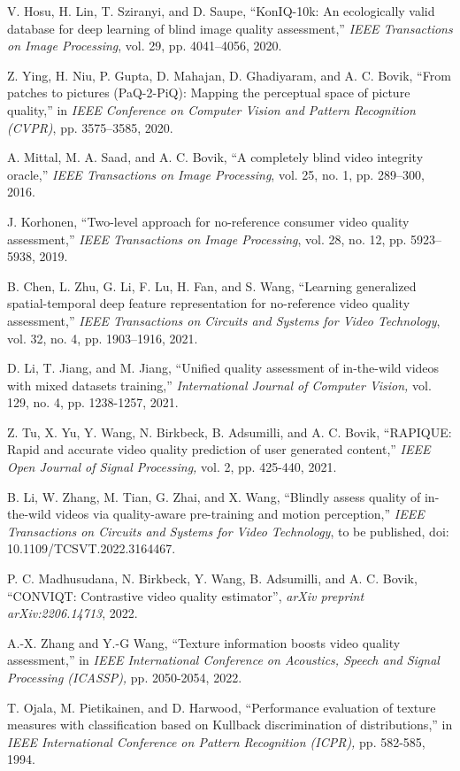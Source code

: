 \documentclass[journal]{IEEEtran}
\begin{document}
\begin{thebibliography}{5}
V. Hosu, H. Lin, T. Sziranyi, and D. Saupe, ``KonIQ-10k: An ecologically valid database for deep learning of blind image quality assessment,'' \emph{IEEE Transactions on Image Processing}, vol. 29, pp. 4041–4056, 2020.

Z. Ying, H. Niu, P. Gupta, D. Mahajan, D. Ghadiyaram, and A. C. Bovik, ``From patches to pictures (PaQ-2-PiQ): Mapping the perceptual space of picture quality,'' in \emph{IEEE Conference on Computer Vision and Pattern Recognition (CVPR)}, pp. 3575–3585, 2020.

A. Mittal, M. A. Saad, and A. C. Bovik, ``A completely blind video integrity oracle,'' \emph{IEEE Transactions on Image Processing}, vol. 25, no. 1, pp. 289–300, 2016.



J. Korhonen, “Two-level approach for no-reference consumer video quality assessment,” \emph{IEEE Transactions on Image Processing}, vol. 28, no. 12, pp. 5923–5938, 2019.

B. Chen, L. Zhu, G. Li, F. Lu, H. Fan, and S. Wang, ``Learning generalized spatial-temporal deep feature representation for no-reference video quality assessment,'' \emph{IEEE Transactions on Circuits and Systems for Video Technology}, vol. 32, no. 4, pp. 1903–1916, 2021.



D. Li, T. Jiang, and M. Jiang, ``Unified quality assessment of in-the-wild videos with mixed datasets training,'' \emph{International Journal of Computer Vision,} vol. 129, no. 4, pp. 1238-1257, 2021.

Z. Tu, X. Yu, Y. Wang, N. Birkbeck, B. Adsumilli, and A. C. Bovik, ``RAPIQUE: Rapid and accurate video quality prediction of user generated content,'' \emph{IEEE Open Journal of Signal Processing,} vol. 2, pp. 425-440, 2021.


B. Li, W. Zhang, M. Tian, G. Zhai, and X. Wang, ``Blindly assess quality of in-the-wild videos via quality-aware pre-training and motion perception,'' \emph{IEEE Transactions on Circuits and Systems for Video Technology}, to be published, doi: 10.1109/TCSVT.2022.3164467.

P. C. Madhusudana, N. Birkbeck, Y. Wang, B. Adsumilli, and A. C. Bovik, ``CONVIQT: Contrastive video quality estimator'',  \emph{arXiv preprint arXiv:2206.14713}, 2022.

A.-X. Zhang and Y.-G Wang, ``Texture information boosts video quality assessment,'' in \emph{IEEE International Conference on Acoustics, Speech and Signal Processing (ICASSP),} pp. 2050-2054, 2022.

T. Ojala, M. Pietikainen, and D. Harwood, ``Performance evaluation of texture measures with classification based on Kullback discrimination of distributions,'' in \emph{IEEE International Conference on Pattern Recognition (ICPR),} pp. 582-585, 1994.

\vspace{-1cm}


\end{thebibliography}
\end{document}
